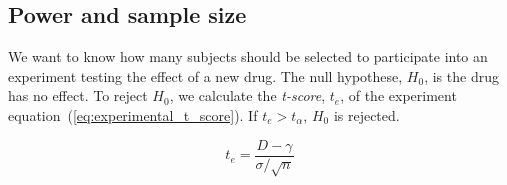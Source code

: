 \documentclass[final, paper=letter,5p,times,twocolumn]{elsarticle}
\theoremstyle{definition}
\begin{document}
%
%
%
%
%
%
%
%

\subsection{Power and sample size}

We want to know how many subjects should be selected to participate into an experiment testing the effect of a new drug. The null hypothese, $H_{0}$, is the drug has no effect. To reject $H_{0}$, we calculate the {\it t-score}, $t_{e}$, of the experiment equation~(\ref{eq:experimental_t_score}). If $t_{e} > t_{\alpha}$, $H_{0}$ is rejected. 

\begin{equation}
  t_{e} = \frac{D - \gamma}{\sigma / \sqrt{n}}
  \label{eq:experimental_t_score}
\end{equation}
\end{document}
